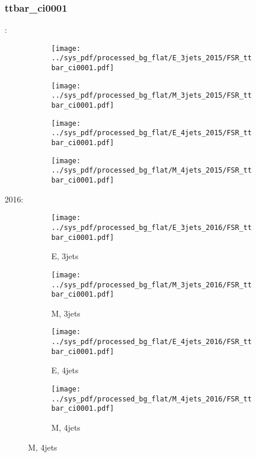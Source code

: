 \documentclass{beamer}
\begin{document}
\begin{frame}
\frametitle{ttbar_ci0001}
\fontsize{5}{1}:
\begin{figure}
\centering
\begin{subfigure}[b]{0.24\textwidth}
\texttt{[image: ../sys\_pdf/processed\_bg\_flat/E\_3jets\_2015/FSR\_ttbar\_ci0001.pdf]}
\end{subfigure}
\begin{subfigure}[b]{0.24\textwidth}
\texttt{[image: ../sys\_pdf/processed\_bg\_flat/M\_3jets\_2015/FSR\_ttbar\_ci0001.pdf]}
\end{subfigure}
\begin{subfigure}[b]{0.24\textwidth}
\texttt{[image: ../sys\_pdf/processed\_bg\_flat/E\_4jets\_2015/FSR\_ttbar\_ci0001.pdf]}
\end{subfigure}
\begin{subfigure}[b]{0.24\textwidth}
\texttt{[image: ../sys\_pdf/processed\_bg\_flat/M\_4jets\_2015/FSR\_ttbar\_ci0001.pdf]}
\end{subfigure}
\end{figure}
2016:
\begin{figure}
\centering
\begin{subfigure}[b]{0.24\textwidth}
\texttt{[image: ../sys\_pdf/processed\_bg\_flat/E\_3jets\_2016/FSR\_ttbar\_ci0001.pdf]}
\captionsetup{font=tiny}
\caption{E, 3jets}
\end{subfigure}
\begin{subfigure}[b]{0.24\textwidth}
\texttt{[image: ../sys\_pdf/processed\_bg\_flat/M\_3jets\_2016/FSR\_ttbar\_ci0001.pdf]}
\captionsetup{font=tiny}
\caption{M, 3jets}
\end{subfigure}
\begin{subfigure}[b]{0.24\textwidth}
\texttt{[image: ../sys\_pdf/processed\_bg\_flat/E\_4jets\_2016/FSR\_ttbar\_ci0001.pdf]}
\captionsetup{font=tiny}
\caption{E, 4jets}
\end{subfigure}
\begin{subfigure}[b]{0.24\textwidth}
\texttt{[image: ../sys\_pdf/processed\_bg\_flat/M\_4jets\_2016/FSR\_ttbar\_ci0001.pdf]}
\captionsetup{font=tiny}
\caption{M, 4jets}
\end{subfigure}
\end{figure}
\end{frame}
\end{document}
